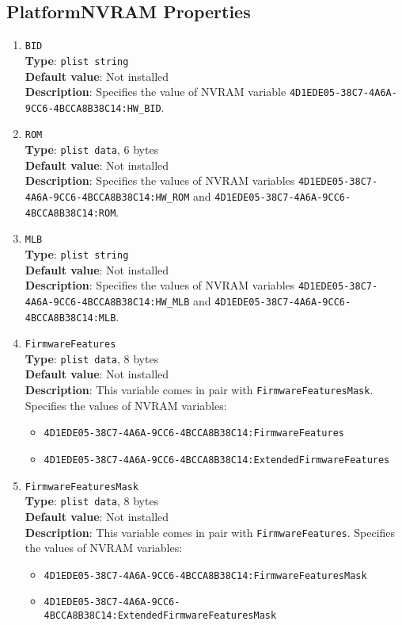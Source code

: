 \documentclass[]{article}
\providecommand{\tightlist}{%
  \setlength{\itemsep}{0pt}\setlength{\parskip}{0pt}}
\begin{document}
\subsection{PlatformNVRAM Properties}\label{platforminfonvram}

\begin{enumerate}
\item
  \texttt{BID}\\
  \textbf{Type}: \texttt{plist\ string}\\
  \textbf{Default value}: Not installed\\
  \textbf{Description}: Specifies the value of NVRAM variable
  \texttt{4D1EDE05-38C7-4A6A-9CC6-4BCCA8B38C14:HW\_BID}.

\item
  \texttt{ROM}\\
  \textbf{Type}: \texttt{plist\ data}, 6 bytes\\
  \textbf{Default value}: Not installed\\
  \textbf{Description}: Specifies the values of NVRAM variables
  \texttt{4D1EDE05-38C7-4A6A-9CC6-4BCCA8B38C14:HW\_ROM} and
  \texttt{4D1EDE05-38C7-4A6A-9CC6-4BCCA8B38C14:ROM}.

\item
  \texttt{MLB}\\
  \textbf{Type}: \texttt{plist\ string}\\
  \textbf{Default value}: Not installed\\
  \textbf{Description}: Specifies the values of NVRAM variables
  \texttt{4D1EDE05-38C7-4A6A-9CC6-4BCCA8B38C14:HW\_MLB} and
  \texttt{4D1EDE05-38C7-4A6A-9CC6-4BCCA8B38C14:MLB}.

\item
  \texttt{FirmwareFeatures}\\
  \textbf{Type}: \texttt{plist\ data}, 8 bytes\\
  \textbf{Default value}: Not installed\\
  \textbf{Description}: This variable comes in pair with \texttt{FirmwareFeaturesMask}.
  Specifies the values of NVRAM variables:
  \begin{itemize}
  \tightlist
  \item \texttt{4D1EDE05-38C7-4A6A-9CC6-4BCCA8B38C14:FirmwareFeatures}
  \item \texttt{4D1EDE05-38C7-4A6A-9CC6-4BCCA8B38C14:ExtendedFirmwareFeatures}
  \end{itemize}

\item
  \texttt{FirmwareFeaturesMask}\\
  \textbf{Type}: \texttt{plist\ data}, 8 bytes\\
  \textbf{Default value}: Not installed\\
  \textbf{Description}: This variable comes in pair with \texttt{FirmwareFeatures}.
  Specifies the values of NVRAM variables:
  \begin{itemize}
  \tightlist
  \item \texttt{4D1EDE05-38C7-4A6A-9CC6-4BCCA8B38C14:FirmwareFeaturesMask}
  \item \texttt{4D1EDE05-38C7-4A6A-9CC6-4BCCA8B38C14:ExtendedFirmwareFeaturesMask}
  \end{itemize}


\end{enumerate}
\end{document}

